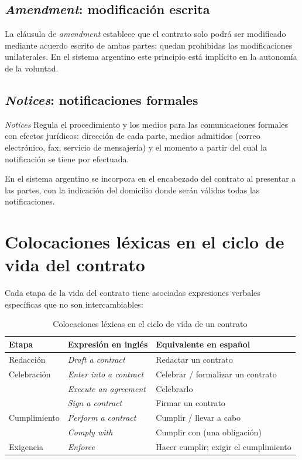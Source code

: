 \documentclass[12pt,oneside]{book}
\begin{document}
\subsection{\textit{Amendment}: modificación escrita}

La cláusula de \textit{amendment} establece que el contrato solo podrá ser modificado mediante acuerdo escrito de ambas partes: quedan prohibidas las modificaciones unilaterales. En el sistema argentino este principio está implícito en la autonomía de la voluntad.

\subsection{\textit{Notices}: notificaciones formales}

\begin{definition}{\textit{Notices}}
Regula el procedimiento y los medios para las comunicaciones formales con efectos jurídicos: dirección de cada parte, medios admitidos (correo electrónico, fax, servicio de mensajería) y el momento a partir del cual la notificación se tiene por efectuada.
\end{definition}

En el sistema argentino se incorpora en el encabezado del contrato al presentar a las partes, con la indicación del domicilio donde serán válidas todas las notificaciones.

\section{Colocaciones léxicas en el ciclo de vida del contrato}
\label{sec:colocaciones-contratos}

Cada etapa de la vida del contrato tiene asociadas expresiones verbales específicas que no son intercambiables:

\begin{table}[H]
\centering
\caption{Colocaciones léxicas en el ciclo de vida de un contrato}
\begin{tabularx}{\textwidth}{>{\raggedright\arraybackslash}p{} >{\raggedright\arraybackslash}p{} >{\raggedright\arraybackslash}X}
\toprule
\textbf{Etapa} & \textbf{Expresión en inglés} & \textbf{Equivalente en español} \\
\midrule
Redacción & \textit{Draft a contract} & Redactar un contrato \\
Celebración & \textit{Enter into a contract} & Celebrar / formalizar un contrato \\
 & \textit{Execute an agreement} & Celebrarlo \\
 & \textit{Sign a contract} & Firmar un contrato \\
Cumplimiento & \textit{Perform a contract} & Cumplir / llevar a cabo \\
 & \textit{Comply with} & Cumplir con (una obligación) \\
Exigencia & \textit{Enforce} & Hacer cumplir; exigir el cumplimiento \\
\bottomrule
\end{tabularx}
\end{table}
\end{document}
